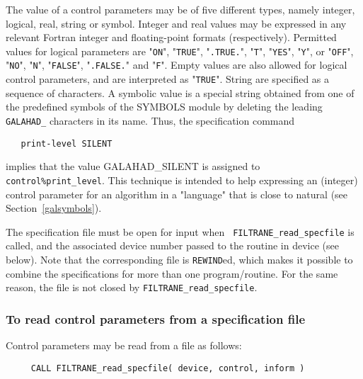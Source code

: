 \documentclass{galahad}
\newcommand{\packagename}{FILTRANE}
\newcommand{\sym}{\sf\small}
\begin{document}
The value of a control parameters may be of five different types, namely
integer, logical, real, string or symbol.
Integer and real values may be expressed in any relevant Fortran integer and
floating-point formats (respectively). Permitted values for logical
parameters are "{\tt ON}", "{\tt TRUE}", "{\tt .TRUE.}", "{\tt T}",
"{\tt YES}", "{\tt Y}", or "{\tt OFF}", "{\tt NO}",
"{\tt N}", "{\tt FALSE}", "{\tt .FALSE.}" and "{\tt F}".
Empty values are also allowed for logical control parameters, and are
interpreted as "{\tt TRUE}". String are specified as a sequence of characters.
A symbolic value is a special string obtained from one of the predefined
symbols of the SYMBOLS module by deleting the leading {\tt GALAHAD\_}
characters in its name. Thus, the specification command
\begin{verbatim}
   print-level SILENT
\end{verbatim}
implies that the value {\sym GALAHAD\_SILENT} is assigned to {\tt
control\%print\_level}.  This technique is intended to help expressing an
(integer) control parameter for an algorithm  in a "language" that is close to
natural (see Section~\ref{galsymbols}).

The specification file must be open for input when {\tt
\packagename\_read\_specfile} is called, and the associated device number
passed to the routine in device (see below).  Note that the corresponding
file is {\tt REWIND}ed, which makes it possible to combine the specifications
for more than one program/routine.  For the same reason, the file is not
closed by {\tt \packagename\_read\_specfile}.

\subsubsection{To read control parameters from a specification file}
\label{readspec}

Control parameters may be read from a file as follows:
\hskip0.5in
\def\baselinestretch{0.8} {\tt \begin{verbatim}
     CALL FILTRANE_read_specfile( device, control, inform )
\end{verbatim}}
\def\baselinestretch{1.0}
\end{document}
